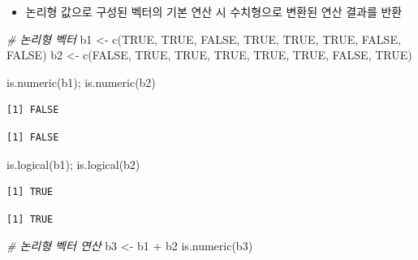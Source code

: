 \documentclass[
  11pt,
]{krantz}
\newenvironment{Shaded}{\begin{snugshade}}{\end{snugshade}}
\newcommand{\CommentTok}[1]{\textcolor[rgb]{0.37,0.37,0.37}{\textit{#1}}}
\newcommand{\ConstantTok}[1]{\textcolor[rgb]{0,0,0}{#1}}
\newcommand{\FunctionTok}[1]{\textcolor[rgb]{0,0,0}{#1}}
\newcommand{\NormalTok}[1]{#1}
\newcommand{\OtherTok}[1]{\textcolor[rgb]{0.37,0.37,0.37}{#1}}
\newcommand{\SpecialCharTok}[1]{\textcolor[rgb]{0,0,0}{#1}}
\providecommand{\tightlist}{%
  \setlength{\itemsep}{0pt}\setlength{\parskip}{0pt}}
\begin{document}
\normalsize

\begin{itemize}
\tightlist
\item
  논리형 값으로 구성된 벡터의 기본 연산 시 수치형으로 변환된 연산 결과를 반환
\end{itemize}

\footnotesize

\begin{Shaded}
\begin{Highlighting}[]
\CommentTok{\# 논리형 벡터}
\NormalTok{b1 }\OtherTok{\textless{}{-}} \FunctionTok{c}\NormalTok{(}\ConstantTok{TRUE}\NormalTok{, }\ConstantTok{TRUE}\NormalTok{, }\ConstantTok{FALSE}\NormalTok{, }\ConstantTok{TRUE}\NormalTok{, }\ConstantTok{TRUE}\NormalTok{, }\ConstantTok{TRUE}\NormalTok{, }\ConstantTok{FALSE}\NormalTok{, }\ConstantTok{FALSE}\NormalTok{)}
\NormalTok{b2 }\OtherTok{\textless{}{-}} \FunctionTok{c}\NormalTok{(}\ConstantTok{FALSE}\NormalTok{, }\ConstantTok{TRUE}\NormalTok{, }\ConstantTok{TRUE}\NormalTok{, }\ConstantTok{TRUE}\NormalTok{, }\ConstantTok{TRUE}\NormalTok{, }\ConstantTok{TRUE}\NormalTok{, }\ConstantTok{FALSE}\NormalTok{, }\ConstantTok{TRUE}\NormalTok{)}

\FunctionTok{is.numeric}\NormalTok{(b1); }\FunctionTok{is.numeric}\NormalTok{(b2)}
\end{Highlighting}
\end{Shaded}

\begin{verbatim}
[1] FALSE
\end{verbatim}

\begin{verbatim}
[1] FALSE
\end{verbatim}

\begin{Shaded}
\begin{Highlighting}[]
\FunctionTok{is.logical}\NormalTok{(b1); }\FunctionTok{is.logical}\NormalTok{(b2)}
\end{Highlighting}
\end{Shaded}

\begin{verbatim}
[1] TRUE
\end{verbatim}

\begin{verbatim}
[1] TRUE
\end{verbatim}

\begin{Shaded}
\begin{Highlighting}[]
\CommentTok{\# 논리형 벡터 연산}
\NormalTok{b3 }\OtherTok{\textless{}{-}}\NormalTok{ b1 }\SpecialCharTok{+}\NormalTok{ b2}
\FunctionTok{is.numeric}\NormalTok{(b3)}
\end{Highlighting}
\end{Shaded}
\end{document}
